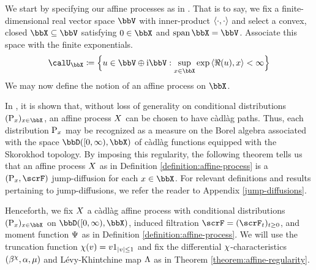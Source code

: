 We start by specifying our affine processes as in \cite{keller2015}.
That is to say, we fix a finite-dimensional real vector space $\vecSpace$ with inner-product ${\langle \cdot , \cdot \rangle}$ and select a convex, closed $\stateSpace \subseteq \vecSpace$ satisfying $0 \in \stateSpace$ and $\operatorname{span}\stateSpace = \vecSpace$.
Associate this space with the finite exponentials.
\begin{equation*}
  \boundedSpace \defeq \Big\{ \momentVar \in \vecSpace \oplus \im\vecSpace : \sup_{\stateVar \in \stateSpace} \exp\prj{\Re(\momentVar)}{\stateVar} < \infty \Big\}
\end{equation*}
We may now define the notion of an affine process on $\stateSpace$.





In \cite[Theorem 1.2.7]{cuchiero2011}, it is shown that, without loss of generality on conditional distributions $(\Prb_\stateVar)_{\stateVar\in\stateSpace}$, an affine process $X$ can be chosen to have c\`adl\`ag paths.
Thus, each distribution ${\operatorname{P}}_x$ may be recognized as a measure on the Borel algebra associated with the space $\pathSpace{[0,\infty)}{\stateSpace}$ of c\`adl\`ag functions equipped with the Skorokhod topology.
By imposing this regularity, the following theorem tells us that an affine process $X$ as in Definition \ref{definition:affine-process} is a $(\Prb_\stateVar, \scrF)$ jump-diffusion for each $\stateVar \in \stateSpace$.
For relevant definitions and results pertaining to jump-diffusions, we refer the reader to Appendix \ref{jump-diffusions}.




Henceforth, we fix $X$ a c\`adl\`ag affine process with conditional distributions $(\Prb_\stateVar)_{\stateVar\in\stateSpace}$ on $\pathSpace{[0,\infty)}{\stateSpace}$, induced filtration $\scrF=(\scrF_t)_{t\geq0}$, and moment function $\Psi$ as in Definition \ref{definition:affine-process}.
We will use the truncation function $\chi(v) = v 1_{|v|\leq 1}$ and fix the differential $\chi$-characteristics $(\beta^\chi, \alpha, \mu)$ and L\'evy-Khintchine map $\Lambda$ as in Theorem \ref{theorem:affine-regularity}.
